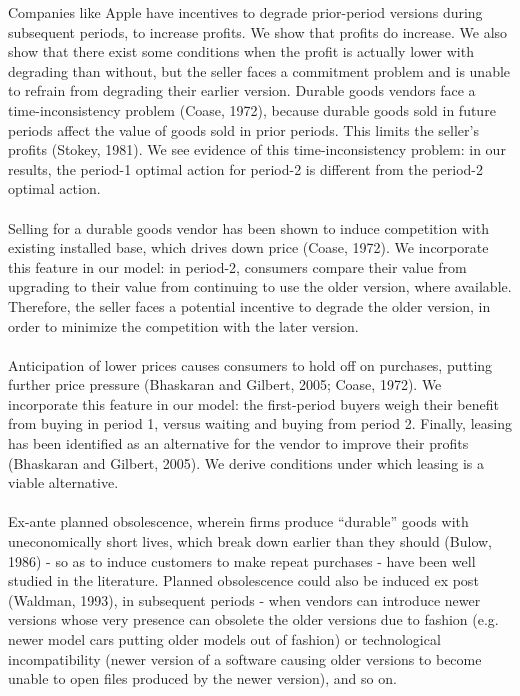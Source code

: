 \documentclass{article}
\begin{document}
Companies like Apple have incentives to degrade prior-period versions during subsequent periods, to increase profits. We show that profits do increase.
We also show that there exist some conditions when the profit is actually lower with degrading than without, but the seller faces a commitment problem
and is unable to refrain from degrading their earlier version. Durable goods vendors face a time-inconsistency problem (Coase, 1972), because durable
goods sold in future periods affect the value of goods sold in prior periods. This limits the seller{'}s profits (Stokey, 1981). We see evidence
of this time-inconsistency problem: in our results, the period-1 optimal action for period-2 is different from the period-2 optimal action.\\
\\
Selling for a durable goods vendor has been shown to induce competition with existing installed base, which drives down price (Coase, 1972). We incorporate
this feature in our model: in period-2, consumers compare their value from upgrading to their value from continuing to use the older version, where
available. Therefore, the seller faces a potential incentive to degrade the older version, in order to minimize the competition with the later version.
\\
\\
Anticipation of lower prices causes consumers to hold off on purchases, putting further price pressure (Bhaskaran and Gilbert, 2005; Coase, 1972).
We incorporate this feature in our model: the first-period buyers weigh their benefit from buying in period 1, versus waiting and buying from period
2. Finally, leasing has been identified as an alternative for the vendor to improve their profits (Bhaskaran and Gilbert, 2005). We derive conditions
under which leasing is a viable alternative.\\
\\
Ex-ante planned obsolescence, wherein firms produce {``}durable{''} goods with uneconomically short lives, which break down earlier than they should
(Bulow, 1986) - so as to induce customers to make repeat purchases - have been well studied in the literature. Planned obsolescence could also be
induced ex post (Waldman, 1993), in subsequent periods - when vendors can introduce newer versions whose very presence can obsolete the older versions
due to fashion (e.g. newer model cars putting older models out of fashion) or technological incompatibility (newer version of a software causing
older versions to become unable to open files produced by the newer version), and so on. \\
\end{document}
